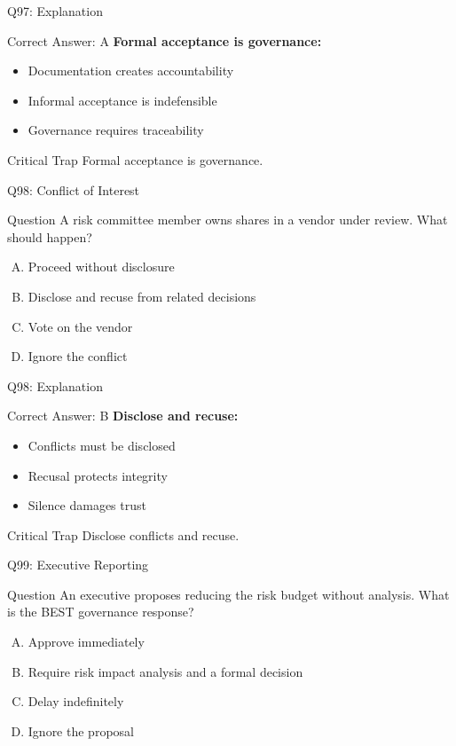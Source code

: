 \documentclass{beamer}
\begin{document}
	\begin{frame}{Q97: Explanation}
		\begin{block}{Correct Answer: A}
			\textbf{Formal acceptance is governance:}
			\begin{itemize}
				\item Documentation creates accountability
				\item Informal acceptance is indefensible
				\item Governance requires traceability
			\end{itemize}
		\end{block}
		\begin{alertblock}{Critical Trap}
			Formal acceptance is governance.
		\end{alertblock}
	\end{frame}
	
	\begin{frame}{Q98: Conflict of Interest}
		\begin{block}{Question}
			A risk committee member owns shares in a vendor under review. What should happen?
		\end{block}
		\begin{enumerate}[(A)]
			\item Proceed without disclosure
			\item Disclose and recuse from related decisions
			\item Vote on the vendor
			\item Ignore the conflict
		\end{enumerate}
	\end{frame}
	
	\begin{frame}{Q98: Explanation}
		\begin{block}{Correct Answer: B}
			\textbf{Disclose and recuse:}
			\begin{itemize}
				\item Conflicts must be disclosed
				\item Recusal protects integrity
				\item Silence damages trust
			\end{itemize}
		\end{block}
		\begin{alertblock}{Critical Trap}
			Disclose conflicts and recuse.
		\end{alertblock}
	\end{frame}
	
	\begin{frame}{Q99: Executive Reporting}
		\begin{block}{Question}
			An executive proposes reducing the risk budget without analysis. What is the BEST governance response?
		\end{block}
		\begin{enumerate}[(A)]
			\item Approve immediately
			\item Require risk impact analysis and a formal decision
			\item Delay indefinitely
			\item Ignore the proposal
		\end{enumerate}
	\end{frame}
	
\end{document}

